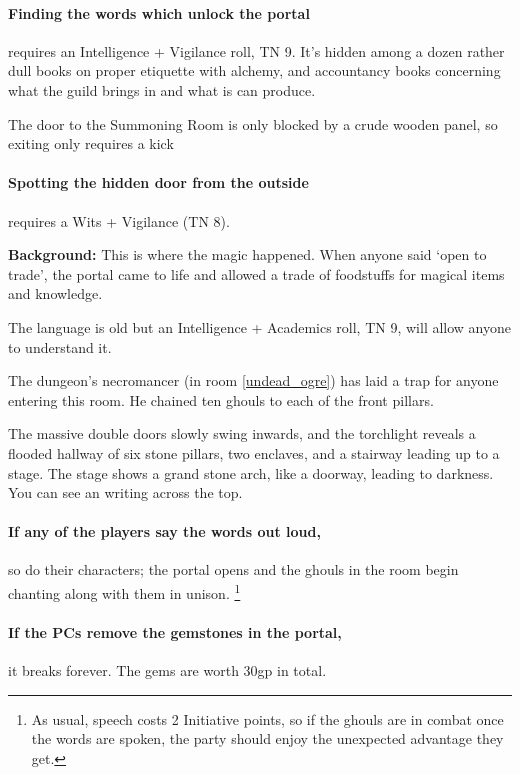\begin{multicols}{2}
\paragraph{Finding the words which unlock the portal}
requires an Intelligence + Vigilance roll, TN 9.
It's hidden among a dozen rather dull books on proper etiquette with alchemy, and accountancy books concerning what the guild brings in and what is can produce.

The door to the Summoning Room is only blocked by a crude wooden panel, so exiting only requires a kick

\paragraph{Spotting the hidden door from the outside}
requires a Wits + Vigilance (TN 8).


\textbf{Background:}
This is where the magic happened.
When anyone said `open to trade', the portal came to life and allowed a trade of foodstuffs for magical items and knowledge.

The language is old but an Intelligence + Academics roll, TN 9, will allow anyone to understand it.

The dungeon's necromancer (in room \ref{undead_ogre}) has laid a trap for anyone entering this room.
He chained ten ghouls to each of the front pillars.


\begin{boxtext}

  The massive double doors slowly swing inwards, and the torchlight reveals a flooded hallway of six stone pillars, two enclaves, and a stairway leading up to a stage.
  The stage shows a grand stone arch, like a doorway, leading to darkness.
  You can see an writing across the top.

\end{boxtext}

\paragraph{If any of the players say the words out loud,}
so do their characters; the portal opens and the ghouls in the room begin chanting along with them in unison.%
\footnote{As usual, speech costs 2 Initiative points, so if the ghouls are in combat once the words are spoken, the party should enjoy the unexpected advantage they get.}

\paragraph{If the PCs remove the gemstones in the portal,}
it breaks forever.
The gems are worth 30gp in total.


\end{multicols}

